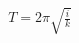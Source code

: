 \documentclass[preview]{standalone}
\begin{document}
\begin{align*}
T = 2\pi \sqrt{\frac{i}{k}}
\end{align*}
\end{document}
